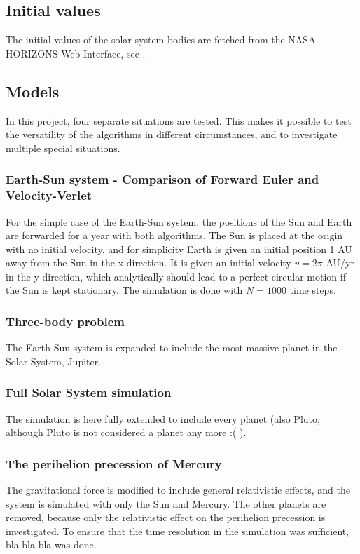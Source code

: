 \documentclass[aps,reprint]{revtex4-1}
\begin{document}
\subsection{Initial values}
The initial values of the solar system bodies are fetched from the NASA HORIZONS
Web-Interface, see \cite{nasa}.
\subsection{Models}
In this project, four separate situations are tested. This makes it possible to test the versatility of the
algorithms in different circumstances, and to investigate multiple special situations.
\subsubsection{Earth-Sun system - Comparison of Forward Euler and Velocity-Verlet}
\label{seq:earthsunmethod}
For the simple case of the Earth-Sun system, the positions of the Sun and Earth are
forwarded for a year with both algorithms. The Sun is placed at the origin with
no initial velocity, and for simplicity Earth is given an initial position 1 AU
away from the Sun in the x-direction. It is given an initial velocity $v = 2\pi$ AU/yr
in the y-direction, which analytically should lead to a perfect circular motion
if the Sun is kept stationary. The simulation is done with $N = 1000$ time steps.
\subsubsection{Three-body problem}
The Earth-Sun system is expanded to include the most massive planet in the Solar System, Jupiter.
\subsubsection{Full Solar System simulation}
The simulation is here fully extended to include every planet (also Pluto, although Pluto is not considered a planet any more :( ).
\subsubsection{The perihelion precession of Mercury}
The gravitational force is modified to include general relativistic effects, and
the system is simulated with only the Sun and Mercury. The other planets are removed,
because only the relativistic effect on the perihelion precession is investigated.
To ensure that the time resolution in the simulation was sufficient, bla bla bla
was done.
\end{document}
